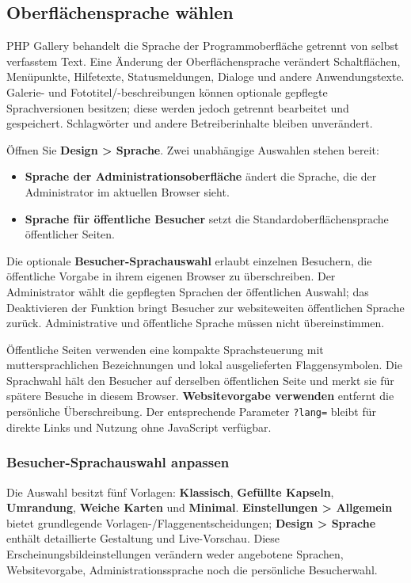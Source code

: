 \documentclass[11pt,a4paper]{article}
\newcommand{\ui}[1]{\textbf{#1}}
\newcommand{\codeword}[1]{\nolinkurl{#1}}
\begin{document}
\subsection{Oberflächensprache wählen}
\label{sec:language-selection}

PHP Gallery behandelt die Sprache der Programmoberfläche getrennt von selbst
verfasstem Text. Eine Änderung der Oberflächensprache verändert Schaltflächen,
Menüpunkte, Hilfetexte, Statusmeldungen, Dialoge und andere Anwendungstexte.
Galerie- und Fototitel/-beschreibungen können optionale gepflegte
Sprachversionen besitzen; diese werden jedoch getrennt bearbeitet und
gespeichert. Schlagwörter und andere Betreiberinhalte bleiben unverändert.

Öffnen Sie \ui{Design > Sprache}. Zwei unabhängige Auswahlen stehen bereit:

\begin{itemize}
  \item \ui{Sprache der Administrationsoberfläche} ändert die Sprache, die der
  Administrator im aktuellen Browser sieht.
  \item \ui{Sprache für öffentliche Besucher} setzt die
  Standardoberflächensprache öffentlicher Seiten.
\end{itemize}

Die optionale \ui{Besucher-Sprachauswahl} erlaubt einzelnen Besuchern, die
öffentliche Vorgabe in ihrem eigenen Browser zu überschreiben. Der Administrator
wählt die gepflegten Sprachen der öffentlichen Auswahl; das Deaktivieren der
Funktion bringt Besucher zur websiteweiten öffentlichen Sprache zurück.
Administrative und öffentliche Sprache müssen nicht übereinstimmen.

Öffentliche Seiten verwenden eine kompakte Sprachsteuerung mit
muttersprachlichen Bezeichnungen und lokal ausgelieferten Flaggensymbolen. Die
Sprachwahl hält den Besucher auf derselben öffentlichen Seite und merkt sie für
spätere Besuche in diesem Browser. \ui{Websitevorgabe verwenden} entfernt die
persönliche Überschreibung. Der entsprechende Parameter \codeword{?lang=} bleibt
für direkte Links und Nutzung ohne JavaScript verfügbar.

\subsubsection{Besucher-Sprachauswahl anpassen}

Die Auswahl besitzt fünf Vorlagen: \ui{Klassisch}, \ui{Gefüllte Kapseln},
\ui{Umrandung}, \ui{Weiche Karten} und \ui{Minimal}. \ui{Einstellungen >
Allgemein} bietet grundlegende Vorlagen-/Flaggenentscheidungen; \ui{Design >
Sprache} enthält detaillierte Gestaltung und Live-Vorschau. Diese
Erscheinungsbildeinstellungen verändern weder angebotene Sprachen,
Websitevorgabe, Administrationssprache noch die persönliche Besucherwahl.
\end{document}
